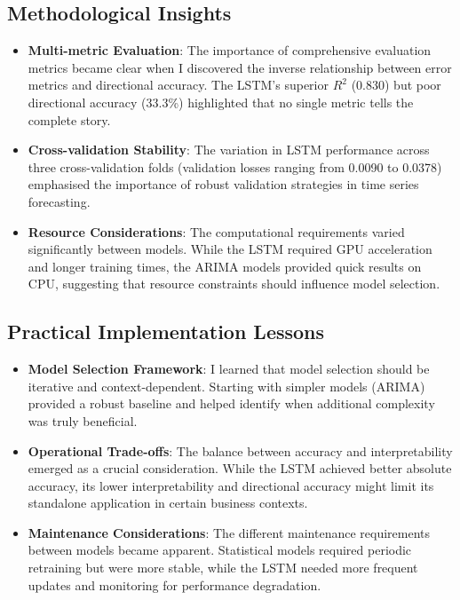 \documentclass[12pt,a4paper]{report}
\begin{document}
\subsection{Methodological Insights}
\begin{itemize}
    \item \textbf{Multi-metric Evaluation}: The importance of comprehensive evaluation metrics became clear when I discovered the inverse relationship between error metrics and directional accuracy. The LSTM's superior $R^2$ (0.830) but poor directional accuracy (33.3\%) highlighted that no single metric tells the complete story.
    
    \item \textbf{Cross-validation Stability}: The variation in LSTM performance across three cross-validation folds (validation losses ranging from 0.0090 to 0.0378) emphasised the importance of robust validation strategies in time series forecasting.
    
    \item \textbf{Resource Considerations}: The computational requirements varied significantly between models. While the LSTM required GPU acceleration and longer training times, the ARIMA models provided quick results on CPU, suggesting that resource constraints should influence model selection.
\end{itemize}

\subsection{Practical Implementation Lessons}
\begin{itemize}
    \item \textbf{Model Selection Framework}: I learned that model selection should be iterative and context-dependent. Starting with simpler models (ARIMA) provided a robust baseline and helped identify when additional complexity was truly beneficial.
    
    \item \textbf{Operational Trade-offs}: The balance between accuracy and interpretability emerged as a crucial consideration. While the LSTM achieved better absolute accuracy, its lower interpretability and directional accuracy might limit its standalone application in certain business contexts.
    
    \item \textbf{Maintenance Considerations}: The different maintenance requirements between models became apparent. Statistical models required periodic retraining but were more stable, while the LSTM needed more frequent updates and monitoring for performance degradation.
\end{itemize}
\end{document}
